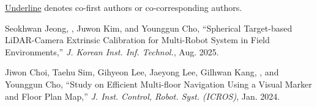
\begin{cvparagraph}
  \underline{Underline} denotes co-first authors or co-corresponding authors.
\end{cvparagraph}







\begin{pubSubsectionNum}
    \item Seokhwan Jeong, \hogyunkim, Juwon Kim, and Younggun Cho, ``Spherical Target-based LiDAR-Camera Extrinsic Calibration for Multi-Robot System in Field Environments,'' \textit{J. Korean Inst. Inf. Technol.}, Aug. 2025.
    \item Jiwon Choi, Taehu Sim, Gihyeon Lee, Jaeyong Lee, Gilhwan Kang, \hogyunkim, and Younggun Cho, ``Study on Efficient Multi-floor Navigation Using a Visual Marker and Floor Plan Map,'' \textit{J. Inst. Control, Robot. Syst. (ICROS)}, Jan. 2024.
\end{pubSubsectionNum}
